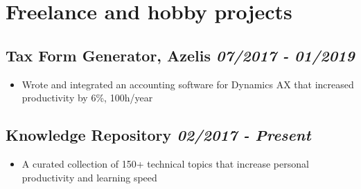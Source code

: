 \documentclass[a4paper]{article}
\newcommand{\bolditalicpair}
[2]
{\textbf{#1} \texorpdfstring{\hfill}{} \textit{#2}}
\begin{document}




\section{Freelance and hobby projects}
\subsection{\bolditalicpair{Tax Form Generator, Azelis}{07/2017 - 01/2019}}

\begin{itemize}
  \item Wrote and integrated an accounting software for Dynamics AX that increased productivity by 6\%, 100h/year
\end{itemize}

\subsection{\bolditalicpair{Knowledge Repository}{02/2017 - Present}}

\begin{itemize}
  \item A curated collection of 150+ technical topics that increase personal productivity and learning speed
\end{itemize}


\end{document}
